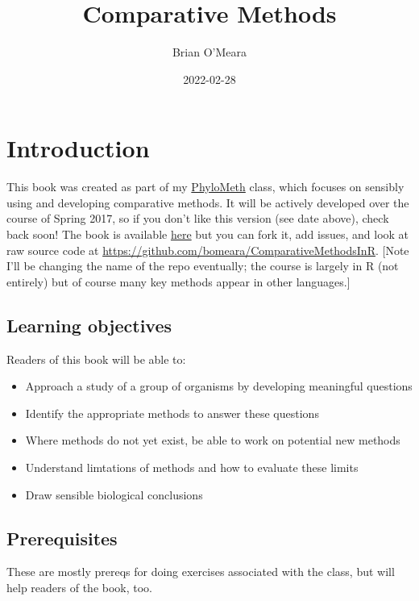\documentclass[
]{article}
\title{Comparative Methods}
\author{Brian O'Meara}
\date{2022-02-28}
\providecommand{\tightlist}{%
  \setlength{\itemsep}{0pt}\setlength{\parskip}{0pt}}
\begin{document}
\maketitle

{
\setcounter{tocdepth}{2}
\tableofcontents
}
\hypertarget{introduction}{%
\section{Introduction}\label{introduction}}

This book was created as part of my \href{http://phylometh.info}{PhyloMeth} class, which focuses on sensibly using and developing comparative methods. It will be actively developed over the course of Spring 2017, so if you don't like this version (see date above), check back soon! The book is available \href{https://bookdown.org/bomeara/comparative-methods/}{here} but you can fork it, add issues, and look at raw source code at \url{https://github.com/bomeara/ComparativeMethodsInR}. {[}Note I'll be changing the name of the repo eventually; the course is largely in R (not entirely) but of course many key methods appear in other languages.{]}

\hypertarget{learning-objectives}{%
\subsection{Learning objectives}\label{learning-objectives}}

Readers of this book will be able to:

\begin{itemize}
\tightlist
\item
  Approach a study of a group of organisms by developing meaningful questions
\item
  Identify the appropriate methods to answer these questions
\item
  Where methods do not yet exist, be able to work on potential new methods
\item
  Understand limtations of methods and how to evaluate these limits
\item
  Draw sensible biological conclusions
\end{itemize}

\hypertarget{prerequisites}{%
\subsection{Prerequisites}\label{prerequisites}}

These are mostly prereqs for doing exercises associated with the class, but will help readers of the book, too.
\end{document}
